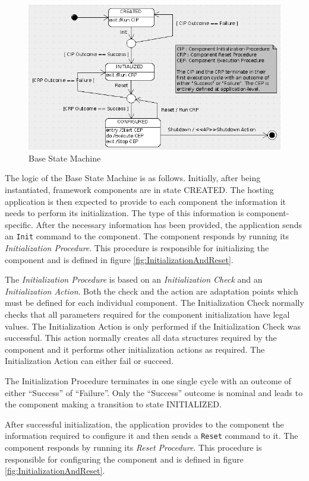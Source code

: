 \documentclass[a4paper,10pt]{article}
\begin{document}
\begin{figure}[h]
 \centering
 \includegraphics[scale=0.3,keepaspectratio=true]{BaseSM.png}
 \caption{Base State Machine}
 \label{fig:BaseSM}
\end{figure}

The logic of the Base State Machine is as follows. Initially, after being instantiated, framework components are in state CREATED. The hosting application is then expected to provide to each component the information it needs to perform its initialization. The type of this information is component-specific. After the necessary information has been provided, the application sends an \texttt{Init} command to the component. The component responds by running its \textit{Initialization Procedure}. This procedure is responsible for initializing the component and is defined in figure \ref{fig:InitializationAndReset}. 

The \textit{Initialization Procedure} is based on an \textit{Initialization Check} and an \textit{Initialization Action}. Both the check and the action are adaptation points which must be defined for each individual component. The Initialization Check normally checks that all parameters required for the component initialization have legal values.  The Initialization Action is only performed if the Initialization Check was successful.  This action normally creates all data structures required by the component and it performs other initialization actions as required. The Initialization Action can either fail or succeed.

The Initialization Procedure terminates in one single cycle with an outcome of either “Success” of “Failure”. Only the “Success” outcome is nominal and leads to the component making a transition to state INITIALIZED.

After successful initialization, the application provides to the component the information required to configure it and then sends a \texttt{Reset} command to it. The component responds by running its \textit{Reset Procedure}.  This procedure is responsible for configuring the component and is defined in figure  \ref{fig:InitializationAndReset}.
 
\end{document}
